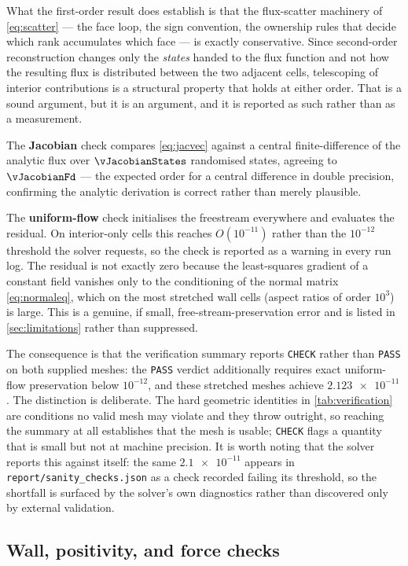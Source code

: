 What the first-order result does establish is that the flux-scatter machinery of
\cref{eq:scatter} --- the face loop, the sign convention, the ownership rules that
decide which rank accumulates which face --- is exactly conservative. Since
second-order reconstruction changes only the \emph{states} handed to the flux
function and not how the resulting flux is distributed between the two adjacent
cells, telescoping of interior contributions is a structural property that holds
at either order. That is a sound argument, but it is an argument, and it is
reported as such rather than as a measurement.

The \textbf{Jacobian} check compares \cref{eq:jacvec} against a central
finite-difference of the analytic flux over $\vJacobianStates$ randomised states,
agreeing to $\vJacobianFd$ --- the expected order for a central difference in
double precision, confirming the analytic derivation is correct rather than
merely plausible.

The \textbf{uniform-flow} check initialises the freestream everywhere and
evaluates the residual. On interior-only cells this reaches $O(10^{-11})$ rather
than the $10^{-12}$ threshold the solver requests, so the check is reported as a
warning in every run log. The residual is not exactly zero because the
least-squares gradient of a constant field vanishes only to the conditioning of
the normal matrix \cref{eq:normaleq}, which on the most stretched wall cells
(aspect ratios of order $10^3$) is large. This is a genuine, if small,
free-stream-preservation error and is listed in \cref{sec:limitations} rather
than suppressed.

The consequence is that the verification summary reports \texttt{CHECK} rather than
\texttt{PASS} on both supplied meshes: the \texttt{PASS} verdict additionally
requires exact uniform-flow preservation below $10^{-12}$, and these stretched
meshes achieve $\num{2.123e-11}$. The distinction is deliberate. The hard geometric
identities in \cref{tab:verification} are conditions no valid mesh may violate and
they throw outright, so reaching the summary at all establishes that the mesh is
usable; \texttt{CHECK} flags a quantity that is small but not at machine precision.
It is worth noting that the solver reports this against itself: the same
$\num{2.1e-11}$ appears in \texttt{report/sanity\_checks.json} as a check recorded
failing its threshold, so the shortfall is surfaced by the solver's own diagnostics
rather than discovered only by external validation.

\subsection{Wall, positivity, and force checks}


